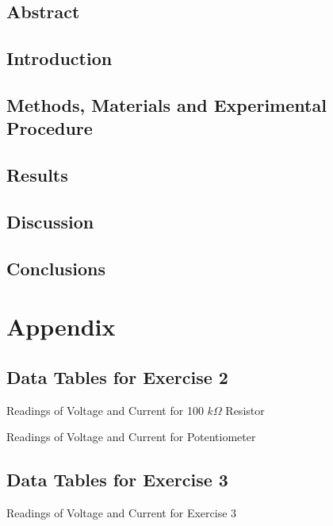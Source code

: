 \documentclass[letterpaper,12pt]{article}
\begin{document}
\subsection{Abstract}

\subsection{Introduction}

\subsection{Methods, Materials and Experimental Procedure}

\subsection{Results}

\subsection{Discussion}

\subsection{Conclusions}

\pagebreak

\appendix

\section{Appendix}

\subsection{Data Tables for Exercise 2}
\begin{table}[H]
  \centering
  
  \caption{Readings of Voltage and Current for 100 $k\Omega$ Resistor}
  \label{100kdata}
\end{table}

\begin{table}[H]
  \centering
  
  \caption{Readings of Voltage and Current for Potentiometer}
  \label{potentiometerdata}
\end{table}

\subsection{Data Tables for Exercise 3}
\begin{table}[H]
  \centering
  
  \caption{Readings of Voltage and Current for Exercise 3}
  \label{ex3data}
\end{table}
\end{document}
